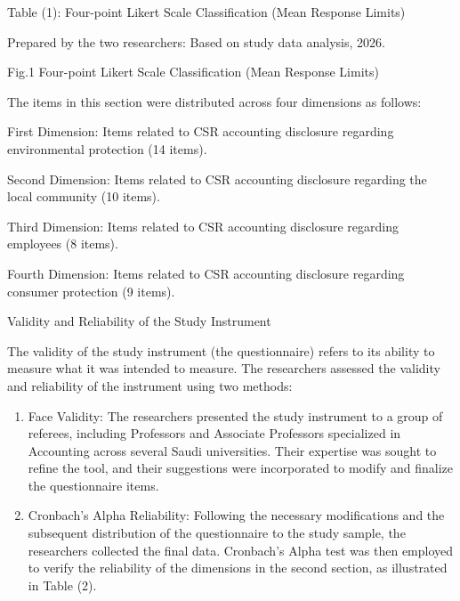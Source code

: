 \documentclass[10pt]{NSP1}
\begin{document}
Table (1): Four-point Likert Scale Classification (Mean Response Limits)

\begin{table}[htbp]
\centering
{}
\caption{}

\end{table}

Prepared by the two researchers: Based on study data analysis, 2026.

Fig.1 Four-point Likert Scale Classification (Mean Response Limits)

The items in this section were distributed across four dimensions as follows:

First Dimension: Items related to CSR accounting disclosure regarding environmental protection (14 items).

Second Dimension: Items related to CSR accounting disclosure regarding the local community (10 items).

Third Dimension: Items related to CSR accounting disclosure regarding employees (8 items).

Fourth Dimension: Items related to CSR accounting disclosure regarding consumer protection (9 items).

Validity and Reliability of the Study Instrument

The validity of the study instrument (the questionnaire) refers to its ability to measure what it was intended to measure. The researchers assessed the validity and reliability of the instrument using two methods:

\begin{enumerate}
  \item Face Validity: The researchers presented the study instrument to a group of referees, including Professors and Associate Professors specialized in Accounting across several Saudi universities. Their expertise was sought to refine the tool, and their suggestions were incorporated to modify and finalize the questionnaire items.
  \item Cronbach’s Alpha Reliability: Following the necessary modifications and the subsequent distribution of the questionnaire to the study sample, the researchers collected the final data. Cronbach’s Alpha test was then employed to verify the reliability of the dimensions in the second section, as illustrated in Table (2).
\end{enumerate}
\end{document}
